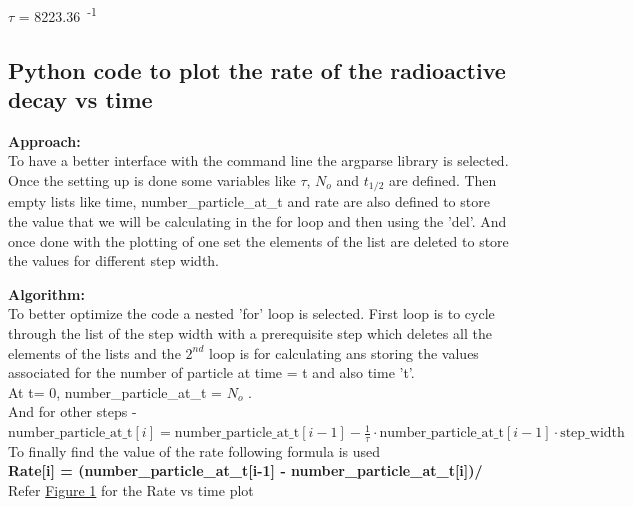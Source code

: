 \documentclass[11pt]{article}
\begin{document}
$\tau$ = 8223.36\, \textsuperscript{-1}


\subsection{Python code to plot the rate of the radioactive decay vs time}
\begin{raggedright}
\begin{justify}
\textbf{Approach:}\\
To have a better interface with the command line the argparse library is selected. Once the setting up is done some variables like $\tau$, $N_{o}$ and $t_{1/2}$ are defined. Then empty lists like time, number\_particle\_at\_t and rate are also defined to store the value that we will be calculating in the for loop and then using the 'del'. And once done with the plotting of one set the elements of the list are deleted to store the values for different step width.
\end{justify}
\end{raggedright}

\begin{raggedright}
\begin{justify}
\textbf{Algorithm:}\\
To better optimize the code a nested 'for' loop is selected. First loop is to cycle through the list of the step width with a prerequisite step which deletes all the elements of the lists and the $2^{nd}$ loop is for calculating ans storing the values associated for the number of particle at time = t and also time 't'.\\
At t= 0, number\_particle\_at\_t = $N_{o}$ .\\
And for other steps - \\
\textbf{\( \text{number\_particle\_at\_t}[i]=\text{number\_particle\_at\_t}[i-1] - \frac{1}{\tau} \cdot \text{number\_particle\_at\_t}[i-1] \cdot \text{step\_width}\)} \\
To finally find the value of the rate following formula is used\\
\textbf{Rate[i] = (number\_particle\_at\_t[i-1] - number\_particle\_at\_t[i])/}\\
Refer \hyperref[fig:Rate of radioactive decay for step width = 10, 100]{Figure 1} for the Rate vs time plot
\end{justify}
\end{raggedright}
\end{document}
